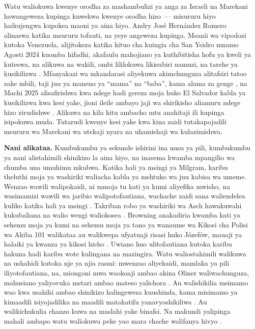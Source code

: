 Watu waliokuwa kwenye orodha za mashambulizi ya anga za Israeli na Marekani hawangeweza kupinga kuwekwa kwenye orodha hizo~— misururu hiyo haikujengwa kupokea maoni ya aina hiyo. Andry José Hernández Romero alinaswa katika msururu tofauti, na yeye angeweza kupinga. Msanii wa vipodozi kutoka Venezuela, alijitokeza katika kituo cha kuingia cha San Ysidro mnamo Agosti 2024 kuomba hifadhi, akafaulu mahojiano ya kuthibitisha hofu ya kweli ya kuteswa, na alikuwa na wakili, ombi lililokuwa likisubiri uamuzi, na tarehe ya kusikilizwa \autocite{LULAC2025HernandezRomero,Vega2025HernandezRomero}. Mfanyakazi wa mkandarasi aliyekuwa akimchunguza alitafsiri tatoo zake mbili, taji juu ya maneno ya “mama” na “baba”, kama alama za genge \autocite{Palomera2025Blade}, na Machi 2025 alisafirishwa kwa ndege hadi gereza moja huko El Salvador kabla ya kusikilizwa kwa kesi yake, jioni ileile ambayo jaji wa shirikisho aliamuru ndege hizo zirudishwe \autocite{jgg2025contempt}. Alikuwa na kila kitu ambacho mtu anahitaji ili kupinga isipokuwa muda. Tutarudi kwenye kesi yake kwa kina zaidi tutakapojadili msururu wa Marekani wa utekaji nyara na uhamishaji wa kulazimishwa.

\textbf{Nani alikataa.} Kumbukumbu ya sekunde ishirini ina nusu ya pili, kumbukumbu ya nani alistahimili shinikizo la aina hiyo, na inasema kwamba mpangilio wa chumba una umuhimu mkubwa. Katika hali ya msingi ya Milgram, karibu theluthi moja ya washiriki waliacha kabla ya mshtuko wa juu kabisa wa umeme. Wenzao wawili walipokaidi, ni mmoja tu kati ya kumi aliyefika mwisho, na wasimamizi wawili wa jaribio walipotofautiana, wachache zaidi sana waliendelea kuliko katika hali ya msingi \autocite{milgram1974obedience}. Takriban robo ya washiriki wa Asch hawakuwahi kukubaliana na walio wengi waliokosea \autocite{asch1956studies}. Browning anakadiria kwamba kati ya sehemu moja ya kumi na sehemu moja ya tano ya wanaume wa Kikosi cha Polisi wa Akiba 101 walikataa au walikwepa ufyatuaji risasi huko Józefów, mauaji ya halaiki ya kwanza ya kikosi hicho \autocite{browning1992ordinary}. Uwiano huo ulitofautiana kutoka karibu hakuna hadi karibu wote kulingana na mazingira. Watu waliostahimili walikuwa na ushahidi kutoka nje ya njia rasmi: mwenzao aliyekaidi, mamlaka ya pili iliyotofautiana, na, miongoni mwa waokoaji ambao akina Oliner waliwachunguza, mahusiano yaliyovuka mstari ambao mateso yalichora \autocite{oliner1988altruistic}. Au walishikilia msimamo wao kwa usahihi ambao shinikizo halingeweza kuushinda, kama misimamo ya kimaadili isiyojadilika na maadili matakatifu yanavyoshikiliwa \autocite{skitka2009limits,ginges2007sacred}. Au walikichukulia chanzo kuwa na maslahi yake binafsi. Na makundi yalipinga mahali ambapo watu waliokuwa peke yao mara chache walifanya hivyo \autocite{gamson1982encounters}.

